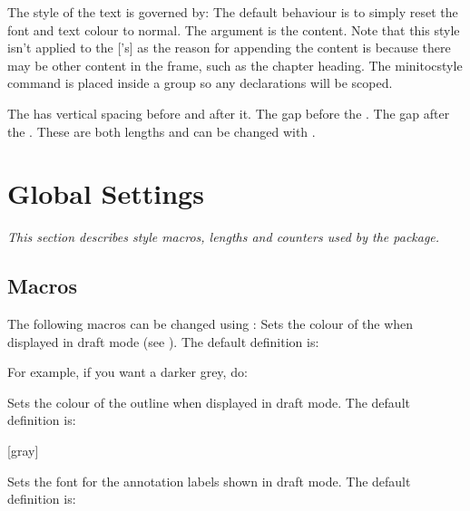 \documentclass[fontsize=12pt]{scrbook}
\newcommand\chapdesc[1]{\par\emph{#1}\par}
\newcommand{\chapdesc}[1]{%
   \appenddynamiccontents*{chaphead}{\par \normalfont\emph{#1}}%
  }
\begin{document}
The style of the  text is governed by:
The default behaviour is to simply reset the font and text colour to
normal. The argument is the  content. Note that this
style isn't applied to the ['s]  as
the reason for appending the  content is because there
may be other content in the frame, such as the chapter heading.
The \gls{minitocstyle} command is placed inside a group so any
declarations will be scoped.

The  has vertical spacing before and after it.
The gap before the .
The gap after the .
These are both lengths and can be changed with .

\chapter{Global Settings}\label{sec:globalsettings}

\chapdesc{This section describes style macros, lengths and counters used
by the \glsfmttext{pkg.flowfram} package.}

\section{Macros}\label{sec:macros}

The following macros can be changed using :
Sets the colour of the  when displayed in draft mode (see ).
The default definition is:
\begin{compactcodebox}
\end{compactcodebox}
For example, if you want a darker grey, do:
\begin{codebox}
\end{codebox}

Sets the colour of the  outline when displayed in
draft mode. The default definition is:
\begin{compactcodebox}
[gray]
\end{compactcodebox}

Sets the font for the annotation labels shown in draft mode.
The default definition is:
\begin{compactcodebox}
\end{compactcodebox}
\end{document}
